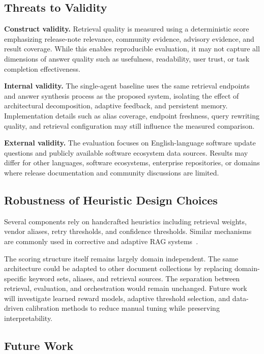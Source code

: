 \documentclass[acmsmall,review,anonymous,screen]{acmart}
\begin{document}
\subsection{Threats to Validity}

\textbf{Construct validity.}
Retrieval quality is measured using a deterministic score emphasizing
release-note relevance, community evidence, advisory evidence, and
result coverage. While this enables reproducible evaluation, it may not
capture all dimensions of answer quality such as usefulness,
readability, user trust, or task completion effectiveness.

\textbf{Internal validity.}
The single-agent baseline uses the same retrieval endpoints and answer
synthesis process as the proposed system, isolating the effect of
architectural decomposition, adaptive feedback, and persistent memory.
Implementation details such as alias coverage, endpoint freshness,
query rewriting quality, and retrieval configuration may still
influence the measured comparison.

\textbf{External validity.}
The evaluation focuses on English-language software update questions
and publicly available software ecosystem data sources. Results may
differ for other languages, software ecosystems, enterprise
repositories, or domains where release documentation and community
discussions are limited.

\subsection{Robustness of Heuristic Design Choices}

Several components rely on handcrafted heuristics including retrieval
weights, vendor aliases, retry thresholds, and confidence thresholds.
Similar mechanisms are commonly used in corrective and adaptive RAG
systems~\cite{yan2024crag,jiang2023flare,asai2024selfrag}.

The scoring structure itself remains largely domain independent. The
same architecture could be adapted to other document collections by
replacing domain-specific keyword sets, aliases, and retrieval sources.
The separation between retrieval, evaluation, and orchestration would
remain unchanged. Future work will investigate learned reward models,
adaptive threshold selection, and data-driven calibration methods to
reduce manual tuning while preserving interpretability.

\subsection{Future Work}
\end{document}
